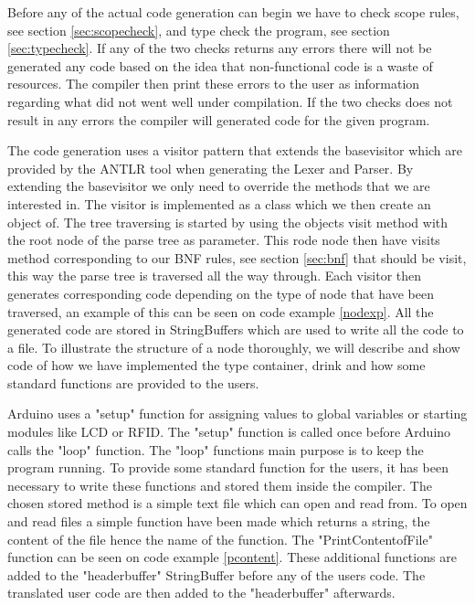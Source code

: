 Before any of the actual code generation can begin we have to check scope rules, see section \ref{sec:scopecheck}, and type check the program, see section \ref{sec:typecheck}. If any of the two checks returns any errors there will not be generated any code based on the idea that non-functional code is a waste of resources. The compiler then print these errors to the user as information regarding what did not went well under compilation. If the two checks does not result in any errors the compiler will generated code for the given program.


The code generation uses a visitor pattern that extends the basevisitor which are provided by the ANTLR tool when generating the Lexer and Parser. By extending the basevisitor we only need to override the methods that we are interested in. The visitor is implemented as a class which we then create an object of. The tree traversing is started by using the objects visit method with the root node of the parse tree as parameter. This rode node then have visits method corresponding to our BNF rules, see section \ref{sec:bnf} that should be visit, this way the parse tree is traversed all the way through. Each visitor then generates corresponding code depending on the type of node that have been traversed, an example of this can be seen on code example \ref{nodexp}. All the generated code are stored in StringBuffers which are used to write all the code to a file. To illustrate the structure of a node thoroughly, we will describe and show code of how we have implemented the type container, drink and how some standard functions are provided to the users.


Arduino uses a "setup" function for assigning values to global variables or starting modules like LCD or RFID. The "setup" function is called once before Arduino calls the "loop" function. The "loop" functions main purpose is to keep the program running. To provide some standard function for the users, it has been necessary to write these functions and stored them inside the compiler. The chosen stored method is a simple text file which can open and read from. To open and read files a simple function have been made which returns a string, the content of the file hence the name of the function. The "PrintContentofFile" function can be seen on code example \ref{pcontent}. These additional functions are added to the "headerbuffer" StringBuffer before any of the users code. The translated user code are then added to the "headerbuffer" afterwards.

